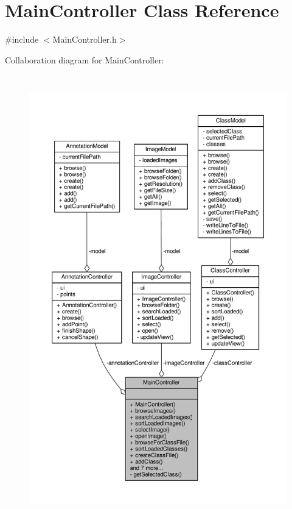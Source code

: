 \hypertarget{classMainController}{}\section{Main\+Controller Class Reference}
\label{classMainController}


{\ttfamily \#include $<$Main\+Controller.\+h$>$}



Collaboration diagram for Main\+Controller\+:
\nopagebreak
\begin{figure}[H]
\begin{center}
\leavevmode
\includegraphics[height=550pt]{classMainController__coll__graph}
\end{center}
\end{figure}
